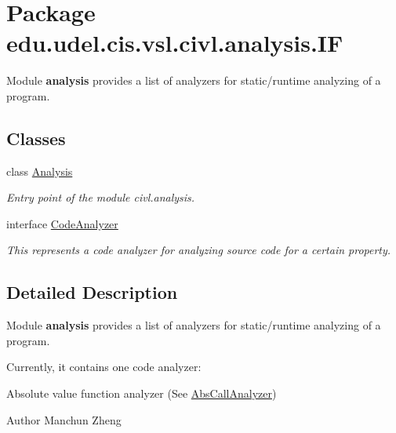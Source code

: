 \hypertarget{namespaceedu_1_1udel_1_1cis_1_1vsl_1_1civl_1_1analysis_1_1IF}{}\section{Package edu.\+udel.\+cis.\+vsl.\+civl.\+analysis.\+I\+F}
\label{namespaceedu_1_1udel_1_1cis_1_1vsl_1_1civl_1_1analysis_1_1IF}


Module {\bfseries analysis} provides a list of analyzers for static/runtime analyzing of a program.  


\subsection*{Classes}
\begin{DoxyCompactItemize}
\item 
class \hyperlink{classedu_1_1udel_1_1cis_1_1vsl_1_1civl_1_1analysis_1_1IF_1_1Analysis}{Analysis}
\begin{DoxyCompactList}\small\item\em Entry point of the module civl.\+analysis. \end{DoxyCompactList}\item 
interface \hyperlink{interfaceedu_1_1udel_1_1cis_1_1vsl_1_1civl_1_1analysis_1_1IF_1_1CodeAnalyzer}{Code\+Analyzer}
\begin{DoxyCompactList}\small\item\em This represents a code analyzer for analyzing source code for a certain property. \end{DoxyCompactList}\end{DoxyCompactItemize}


\subsection{Detailed Description}
Module {\bfseries analysis} provides a list of analyzers for static/runtime analyzing of a program. 

Currently, it contains one code analyzer\+: 
\begin{DoxyItemize}
\item Absolute value function analyzer (See \hyperlink{}{Abs\+Call\+Analyzer}) 
\end{DoxyItemize}

\begin{DoxyAuthor}{Author}
Manchun Zheng 
\end{DoxyAuthor}
